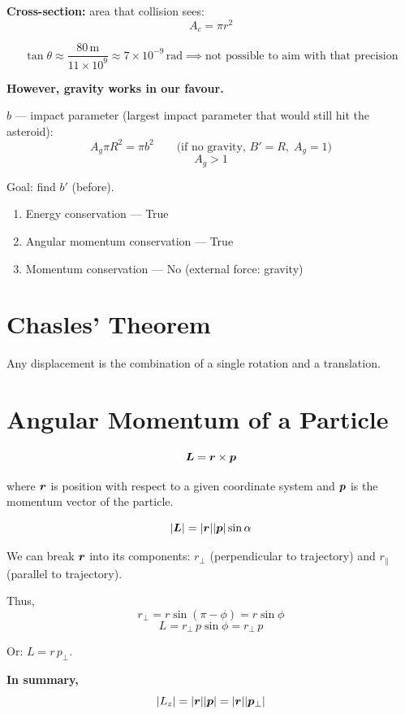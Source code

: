 \textbf{Cross-section:} area that collision sees:
\[
    A_c = \pi r^2
\]

\[
    \tan\theta \approx \frac{80\,\text{m}}{11\times10^9} \approx 7\times10^{-9}\,\text{rad}
    \implies \text{not possible to aim with that precision}
\]

\textbf{However, gravity works in our favour.}

$b$ — impact parameter (largest impact parameter that would still hit the asteroid):
\[
    A_g \pi R^2 = \pi b^2 \qquad \text{(if no gravity, }B'=R,\;A_g=1\text{)}
\]
\[
    A_g > 1
\]

Goal: find $b'$ (before).
\begin{enumerate}
    \item Energy conservation — True
    \item Angular momentum conservation — True
    \item Momentum conservation — No (external force: gravity)
\end{enumerate}

\section{Chasles' Theorem}

\begin{theorem}
Any displacement is the combination of a single rotation and a translation.
\end{theorem}

\section{Angular Momentum of a Particle}

\[
    \vect{L} = \lvect{r}\times\lvect{p}
\]

where $\bm{r}$ is position with respect to a given coordinate system and $\bm{p}$ is the momentum vector of the particle.

\[
    |\vect{L}| = |\lvect{r}||\lvect{p}|\sin\alpha
\]

We can break $\bm{r}$ into its components: $r_\perp$ (perpendicular to trajectory) and $r_\parallel$ (parallel to trajectory).

Thus,
\[
    r_\perp = r\sin(\pi-\phi) = r\sin\phi
\]
\[
    L = r_\perp\, p \sin\phi = r_\perp\, p
\]

Or: $L = r\, p_\perp$.

\textbf{In summary,}
\[
    |L_z| = |\bm{r}||\bm{p}| = |\bm{r}||\bm{p}_\perp|
\]

